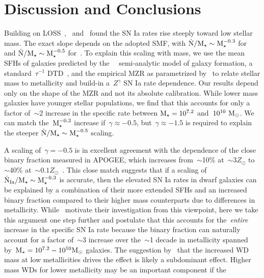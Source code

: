 
\section{Discussion and Conclusions}
\label{iarates:sec:conclusions}

Building on LOSS~\citep{Li2011},~\citet{Brown2019} and~\citet{Wiseman2021}
found the SN Ia rates rise steeply toward low stellar mass.
The exact slope depends on the adopted SMF, with
$\dot{\text{N}} / \text{M}_\star \sim \text{M}_\star^{-0.3}$ for~\citet{Baldry2012} and
$\dot{\text{N}} / \text{M}_\star \sim \text{M}_\star^{-0.5}$ for~\citet{Bell2003}.
To explain this scaling with mass, we use the mean SFHs of galaxies predicted
by the~\um~\citep{Behroozi2019} semi-analytic model of galaxy formation, a
standard~$\tau^{-1}$ DTD~\citep[e.g.,][]{Maoz2012a}, and the empirical MZR as
parametrized by~\citet{Zahid2014} to relate stellar mass to metallicity and
build-in a~$Z^\gamma$ SN Ia rate dependence.
Our results depend only on the shape of the MZR and not its absolute
calibration.
While lower mass galaxies have younger stellar populations, we find that this
accounts for only a factor of~$\sim$2 increase in the specific rate between
$\text{M}_\star = 10^{7.2}$ and~$10^{10}~\text{M}_\odot$.
We can match the~$\text{M}_\star^{-0.3}$ increase if~$\gamma \approx -0.5$,
but~$\gamma \approx -1.5$ is required to explain the steeper
$\dot{\text{N}} / \text{M}_\star \sim \text{M}_\star^{-0.5}$ scaling.
\par
A scaling of~$\gamma = -0.5$ is in excellent agreement with the dependence of
the close binary fraction measured in APOGEE, which increases from~$\sim$10\%
at~$\sim$$3Z_\odot$ to~$\sim$40\% at~$\sim$$0.1Z_\odot$~\citep{Moe2019}.
This close match suggests that if a scaling of
$\dot{\text{N}}_\text{Ia} / \text{M}_\star \sim \text{M}_\star^{-0.3}$ is accurate, then the
elevated SN Ia rates in dwarf galaxies can be explained by a combination of
their more extended SFHs and an increased binary fraction compared to their
higher mass counterparts due to differences in metallicity.
While~\citet{Gandhi2022} motivate their investigation from this viewpoint, here
we take this argument one step further and postulate that this accounts for
the~\textit{entire} increase in the specific SN Ia rate because the binary
fraction can naturally account for a factor of~$\sim$3 increase over
the~$\sim$1 decade in metallicity spanned by~$\text{M}_\star = 10^{7.2} - 10^{10}
\text{M}_\odot$ galaxies.
The suggestion by~\citet{Kistler2013} that the increased WD mass at low
metallicities drives the effect is likely a subdominant effect.
Higher mass WDs for lower metallicity may be an important component if the
